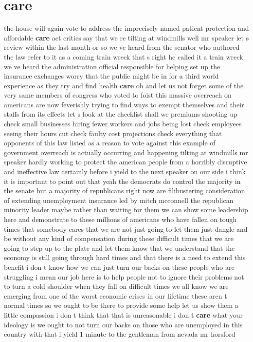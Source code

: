 \documentclass{article}
\begin{document}
\section*{care}
the house will again vote to address the imprecisely named patient protection and affordable {\bf \color{red} care} act critics say that we re tilting at windmills well mr speaker let s review within the last month or so we ve heard from the senator who authored the law refer to it as a coming train wreck that s right he called it a train wreck we ve heard the administration official responsible for helping set up the insurance exchanges worry that the public might be in for a third world experience as they try and find health {\bf \color{red} care} oh and let us not forget some of the very same members of congress who voted to foist this massive overreach on americans are now feverishly trying to find ways to exempt themselves and their staffs from its effects let s look at the checklist shall we premiums shooting up check small businesses hiring fewer workers and jobs being lost check employees seeing their hours cut check faulty cost projections check everything that opponents of this law listed as a reason to vote against this example of government overreach is actually occurring and happening tilting at windmills mr speaker hardly working to protect the american people from a horribly disruptive and ineffective law certainly
\vspace{8mm}
before i yield to the next speaker on our side i think it is important to point out that yeah the democrats do control the majority in the senate but a majority of republicans right now are filibustering consideration of extending unemployment insurance led by mitch mcconnell the republican minority leader maybe rather than waiting for them we can show some leadership here and demonstrate to these millions of americans who have fallen on tough times that somebody cares that we are not just going to let them just dangle and be without any kind of compensation during these difficult times that we are going to step up to the plate and let them know that we understand that the economy is still going through hard times and that there is a need to extend this benefit i don t know how we can just turn our backs on these people who are struggling i mean our job here is to help people not to ignore their problems not to turn a cold shoulder when they fall on difficult times we all know we are emerging from one of the worst economic crises in our lifetime these aren t normal times so we ought to be there to provide some help let us show them a little compassion i don t think that that is unreasonable i don t {\bf \color{red} care} what your ideology is we ought to not turn our backs on those who are unemployed in this country with that i yield 1 minute to the gentleman from nevada mr horsford
\end{document}
